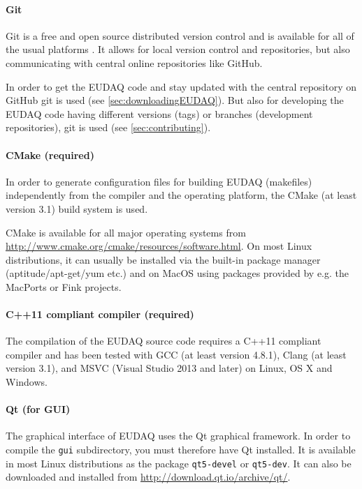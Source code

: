 \paragraph{Git}
Git is a free and open source distributed version control and is available for all of the usual platforms \cite{gitWWW}. 
It allows for local version control and repositories, but also communicating with central online repositories like GitHub.
   
In order to get the EUDAQ code and stay updated with the central repository on GitHub git is used (see \autoref{sec:downloadingEUDAQ}).
But also for developing the EUDAQ code having different versions (tags) or branches (development repositories), git is used (see \autoref{sec:contributing}).


\paragraph{CMake (required)}
In order to generate configuration files for building EUDAQ (makefiles) independently from the compiler and the operating platform, the CMake (at least version 3.1) build system is used.

CMake is available for all major operating systems from \url{http://www.cmake.org/cmake/resources/software.html}. 
On most Linux distributions, it can usually be installed via the built-in package manager (aptitude/apt-get/yum etc.) and on MacOS using packages provided by e.g. the MacPorts or Fink projects.

\paragraph{C++11 compliant compiler (required)}
The compilation of the EUDAQ source code requires a C++11 compliant compiler and has been tested with GCC (at least version 4.8.1), Clang (at least version 3.1), and MSVC (Visual Studio 2013 and later) on Linux, OS X and Windows.

\paragraph{Qt (for GUI)}
The graphical interface of EUDAQ uses the Qt graphical framework.
In order to compile the \texttt{gui} subdirectory, you must therefore have Qt installed.
It is available in most Linux distributions as the package \texttt{qt5-devel} or \texttt{qt5-dev}.
It can also be downloaded and installed from \url{http://download.qt.io/archive/qt/}. 

